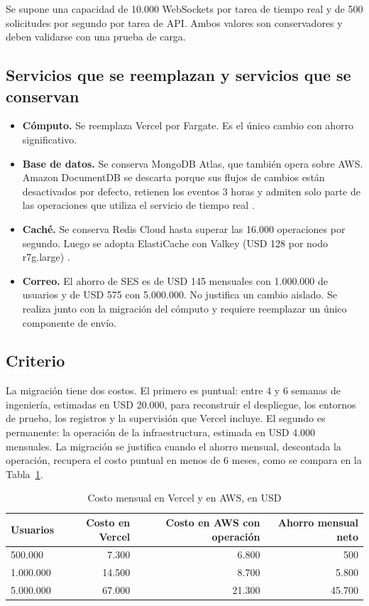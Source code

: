 Se supone una capacidad de 10.000 WebSockets por tarea de tiempo real y de 500 solicitudes por segundo por tarea de API. Ambos valores son conservadores y deben validarse con una prueba de carga.

\subsection{Servicios que se reemplazan y servicios que se conservan}
\begin{itemize}
  \item \textbf{Cómputo.} Se reemplaza Vercel por Fargate. Es el único cambio con ahorro significativo.
  \item \textbf{Base de datos.} Se conserva MongoDB Atlas, que también opera sobre AWS. Amazon DocumentDB se descarta porque sus flujos de cambios están desactivados por defecto, retienen los eventos 3 horas y admiten solo parte de las operaciones que utiliza el servicio de tiempo real \cite{documentdb_change_streams}.
  \item \textbf{Caché.} Se conserva Redis Cloud hasta superar las 16.000 operaciones por segundo. Luego se adopta ElastiCache con Valkey (USD 128 por nodo r7g.large) \cite{aws_elasticache_pricing}.
  \item \textbf{Correo.} El ahorro de SES es de USD 145 mensuales con 1.000.000 de usuarios y de USD 575 con 5.000.000. No justifica un cambio aislado. Se realiza junto con la migración del cómputo y requiere reemplazar un único componente de envío.
\end{itemize}

\subsection{Criterio}
La migración tiene dos costos. El primero es puntual: entre 4 y 6 semanas de ingeniería, estimadas en USD 20.000, para reconstruir el despliegue, los entornos de prueba, los registros y la supervisión que Vercel incluye. El segundo es permanente: la operación de la infraestructura, estimada en USD 4.000 mensuales. La migración se justifica cuando el ahorro mensual, descontada la operación, recupera el costo puntual en menos de 6 meses, como se compara en la Tabla~\ref{tab:criterio_migracion}.

\begin{table}[H]
  \centering
  \renewcommand{\arraystretch}{1.2}
  \small
  \begin{tabular}{l r r r}
    \toprule
    Usuarios & Costo en Vercel & Costo en AWS con operación & Ahorro mensual neto \\
    \midrule
    500.000 & 7.300 & 6.800 & 500 \\
    1.000.000 & 14.500 & 8.700 & 5.800 \\
    5.000.000 & 67.000 & 21.300 & 45.700 \\
    \bottomrule
  \end{tabular}
  \caption{Costo mensual en Vercel y en AWS, en USD}
  \label{tab:criterio_migracion}
\end{table}

